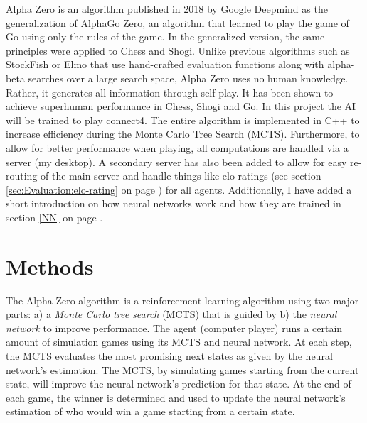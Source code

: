 \documentclass[12pt]{article}
\newcommand{\sectionref}[1]{section \ref{#1} on page \pageref{#1}}
\begin{document}
\maketitle
\begin{abstract}
\noindent Alpha Zero is an AI algorythem, that is capable of learning to play zero sum stated multiplayer games. These types of games include Go, Chess, Phi Sho and so forth. This is done by training a neural network and from data generated by a Monte Carlo Tree Serch. This document also explains how neural networks work and a short explenation of the infrastructure around the AI to allow for playing on remote devices.
~\cite{silver2018general}\cite{silver2017mastering}
\end{abstract}
\newpage
\tableofcontents
\newpage

Alpha Zero is an algorithm published in 2018 by Google Deepmind as the generalization of AlphaGo Zero, an algorithm that learned to play the game of Go using only the rules of the game. In the generalized version, the same principles were applied to Chess and Shogi. Unlike previous algorithms such as StockFish or Elmo that use hand-crafted evaluation functions along with alpha-beta searches over a large search space, Alpha Zero uses no human knowledge. Rather, it generates all information through self-play. It has been shown to achieve superhuman performance in Chess, Shogi and Go. In this project the AI will be trained to play connect4. The entire algorithm is implemented in C++ to increase efficiency during the Monte Carlo Tree Search (MCTS). Furthermore, to allow for better performance when playing, all computations are handled via a server (my desktop). A secondary server has also been added to allow for easy re-routing of the main server and handle things like elo-ratings (see \sectionref{sec:Evaluation:elo-rating}) for all agents. Additionally, I have added a short introduction on how neural networks work and how they are trained in \sectionref{NN}. 

\section{Methods}
\label{Methods}
The Alpha Zero algorithm is a reinforcement learning algorithm using two major parts: a) a {\it Monte Carlo tree search} (MCTS) that is guided by b) the {\it neural network} to improve performance.
The agent (computer player) runs a certain amount of simulation games using its MCTS and neural network. At each step, the MCTS evaluates the most promising next states as given by the neural network's estimation. The MCTS, by simulating games starting from the current state, will improve the neural network's prediction for that state. At the end of each game, the winner is determined and used to update the neural network's estimation of who would win a game starting from a certain state.
\end{document}
